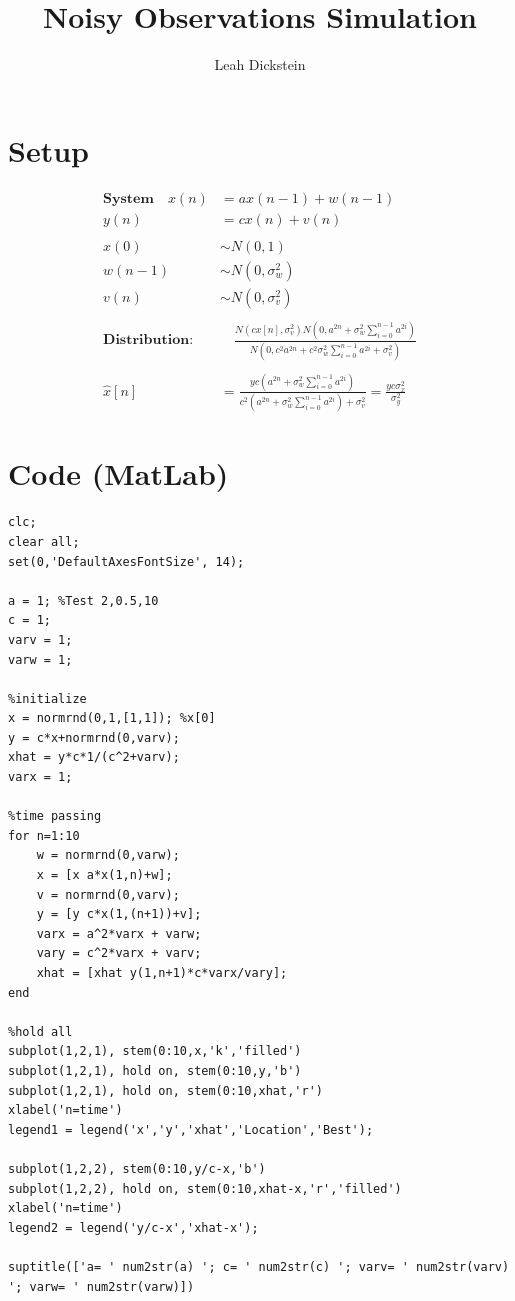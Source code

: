 \documentclass[leqno]{article}
\begin{document}
\title{Noisy Observations Simulation}
\author{Leah Dickstein}

\maketitle
\section*{Setup}
\begin{align*}
\textbf{System} \quad x(n) &= ax(n-1)+w(n-1)\\
y(n) &= cx(n)+v(n)\\
&\\
x(0) &\sim N(0,1)\\
w(n-1) &\sim N(0,\sigma_w^2)\\
v(n) &\sim N(0,\sigma_v^2)\\
&\\
\textbf{Distribution}: &\quad \frac{N(cx[n],\sigma_v^2)N(0,a^{2n}+\sigma_w^2\sum_{i=0}^{n-1}a^{2i})}{N(0,c^2a^{2n}+c^2\sigma_w^2\sum_{i=0}^{n-1}a^{2i}+\sigma_v^2)}\\
&\\
\hat{x}[n] &= \frac{yc(a^{2n}+\sigma_w^2\sum_{i=0}^{n-1}a^{2i})}{c^2(a^{2n}+\sigma_w^2\sum_{i=0}^{n-1}a^{2i})+\sigma_v^2} = \frac{yc\sigma_x^2}{\sigma_y^2}
\end{align*}

\section*{Code (MatLab)}
\begin{verbatim}
clc;
clear all;
set(0,'DefaultAxesFontSize', 14);

a = 1; %Test 2,0.5,10
c = 1;
varv = 1;
varw = 1;

%initialize
x = normrnd(0,1,[1,1]); %x[0]
y = c*x+normrnd(0,varv);
xhat = y*c*1/(c^2+varv);
varx = 1;

%time passing
for n=1:10
    w = normrnd(0,varw);
    x = [x a*x(1,n)+w];
    v = normrnd(0,varv);
    y = [y c*x(1,(n+1))+v];
    varx = a^2*varx + varw;
    vary = c^2*varx + varv;
    xhat = [xhat y(1,n+1)*c*varx/vary];
end

%hold all
subplot(1,2,1), stem(0:10,x,'k','filled')
subplot(1,2,1), hold on, stem(0:10,y,'b')
subplot(1,2,1), hold on, stem(0:10,xhat,'r')
xlabel('n=time')
legend1 = legend('x','y','xhat','Location','Best');

subplot(1,2,2), stem(0:10,y/c-x,'b')
subplot(1,2,2), hold on, stem(0:10,xhat-x,'r','filled')
xlabel('n=time')
legend2 = legend('y/c-x','xhat-x');

suptitle(['a= ' num2str(a) '; c= ' num2str(c) '; varv= ' num2str(varv) '; varw= ' num2str(varw)])
\end{verbatim}
\end{document}
